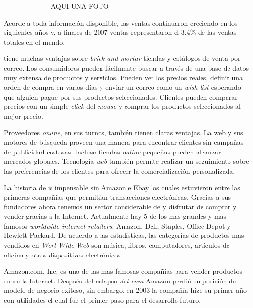 -------------------- AQUI UNA FOTO -------------------

Acorde a toda información disponible, las ventas  continuaron creciendo en los siguientes años y, a finales de 2007 ventas  representaron el 3.4\% de las ventas totales en el mundo.

 tiene muchas ventajas sobre \textit{brick and mortar} tiendas y catálogos de venta por correo. Los consumidores pueden fácilmente buscar a través de una base de datos muy extensa de productos y servicios. Pueden ver los precios reales, definir una orden de compra en varios días y enviar un correo como un \textit{wish list} esperando que alguien pague por sus productos seleccionados. Clientes pueden comparar precios con un simple \textit{click} del \textit{mouse} y comprar los productos seleccionados al mejor precio.

Proveedores \textit{online}, en sus turnos, también tienen claras ventajas. La web y sus motores de búsqueda proveen una manera para encontrar clientes sin campañas de publicidad costosas. Incluso tiendas \textit{online} pequeñas pueden alcanzar mercados globales. 
Tecnología \textit{web} también permite realizar un seguimiento sobre las preferencias de los clientes para ofrecer la comercialización personalizada.

La historia de  is impensable sin Amazon e Ebay los cuales estuvieron entre las primeras compañías que permitían transacciones electrónicas. Gracias a sus fundadores ahora tenemos un sector considerable de  y disfrutar de comprar y vender gracias a la Internet. Actualmente hay 5 de los mas grandes y mas famosos \textit{worldwide internet retailers}: Amazon, Dell, Staples, Office Depot y Hewlett Packard. De acuerdo a las estadísticas, las categorías de productos mas vendidos en \textit{Worl Wide Web} son música, libros, computadores, artículos de oficina y otros dispositivos electrónicos.

Amazon.com, Inc. es uno de las mas famosas compañías   para vender productos sobre la Internet. Después del colapso \textit{dot-com} Amazon perdió su posición de modelo de negocio exitoso, sin embargo, en 2003 la compañía hizo su primer año con utilidades el cual fue el primer paso para el desarrollo futuro.

